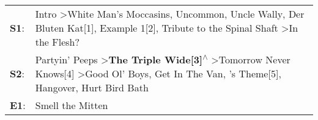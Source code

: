 \begin{supertabular}{p{0.03\textwidth}p{0.92\textwidth}}
 \textbf{S1}:  &                                  Intro\textsuperscript{} \textgreater \enspace White Man's Moccasins\textsuperscript{}, \enspace Uncommon\textsuperscript{}, \enspace Uncle Wally\textsuperscript{}, \enspace Der Bluten Kat[1]\textsuperscript{}, \enspace Example 1[2]\textsuperscript{}, \enspace Tribute to the Spinal Shaft\textsuperscript{} \textgreater \enspace In the Flesh?\textsuperscript{}  \enspace  \\
 \textbf{S2}:  &  Partyin' Peeps\textsuperscript{} \textgreater \enspace \textbf{The Triple Wide[3]\textsuperscript{$\wedge$}} \textgreater \enspace Tomorrow Never Knows[4]\textsuperscript{} \textgreater \enspace Good Ol' Boys\textsuperscript{}, \enspace Get In The Van\textsuperscript{}, 's Theme[5]\textsuperscript{}, \enspace Hangover\textsuperscript{}, \enspace Hurt Bird Bath\textsuperscript{}  \enspace  \\
 \textbf{E1}:  &                                                                                                                                                                                                                                                                                                                                                                       Smell the Mitten\textsuperscript{}  \enspace  \\
\end{supertabular}
